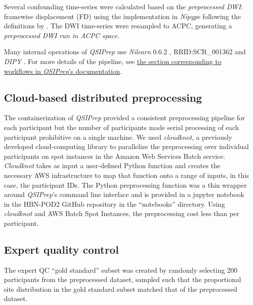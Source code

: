\documentclass[9pt,lineno]{elife}
\begin{document}
\begin{itemize}
Several confounding time-series were calculated based on the
\emph{preprocessed DWI}: framewise displacement (FD) using the implementation
in \emph{Nipype} following the definitions by \citep{power-fd-dvars}. The DWI
time-series were resampled to ACPC, generating a \emph{preprocessed DWI run
in ACPC space}.

\end{itemize}

Many internal operations of \emph{QSIPrep} use \emph{Nilearn} 0.6.2
\citep{nilearn}, RRID:SCR\_001362 and \emph{DIPY} \citep{dipy}. For more details
of the pipeline, see
\href{https://qsiprep.readthedocs.io/en/latest/workflows.html}{the section
corresponding to workflows in \emph{QSIPrep}'s documentation}.

\subsection{Cloud-based distributed preprocessing}

The containerization of \emph{QSIPrep} provided a consistent preprocessing
pipeline for each participant but the number of participants made serial processing of
each participant prohibitive on a single machine. We used \emph{cloudknot}, a
previously developed cloud-computing library \citep{cloudknot} to
parallelize the preprocessing over individual participants on spot instances in the
Amazon Web Services Batch service. \emph{Cloudknot} takes as input a
user-defined Python function and creates the necessary AWS infrastructure to map
that function onto a range of inputs, in this case, the participant IDs. The Python
preprocessing function was a thin wrapper around \emph{QSIPrep}'s command line
interface and is provided in a jupyter notebook in the HBN-POD2 GitHub
repository in the ``notebooks'' directory. Using \emph{cloudknot} and AWS Batch
Spot Instances, the preprocessing cost less than  per participant.

\subsection{Expert quality control}

The expert QC ``gold standard'' subset was created by randomly selecting 200
participants from the preprocessed dataset, sampled such that the proportional site
distribution in the gold standard subset matched that of the preprocessed
dataset.
\end{document}
